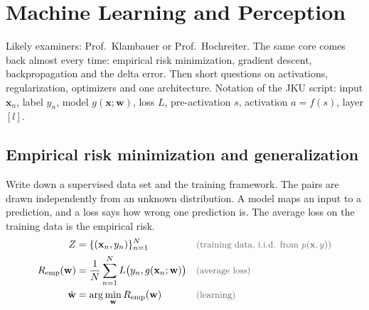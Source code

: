 \section{Machine Learning and Perception}

Likely examiners: Prof.\ Klambauer or Prof.\ Hochreiter. The same core comes back almost every
time: empirical risk minimization, gradient descent, backpropagation and the delta error. Then
short questions on activations, regularization, optimizers and one architecture. Notation of the
JKU script: input $\mathbf{x}_n$, label $y_n$, model $g(\mathbf{x};\mathbf{w})$, loss $L$,
pre-activation $s$, activation $a = f(s)$, layer $[l]$.

\subsection{Empirical risk minimization and generalization}

\begin{qabox}{Write down a supervised data set and the training framework.}
\explain The pairs are drawn independently from an unknown distribution. A model maps an input to a
prediction, and a loss says how wrong one prediction is. The average loss on the training data is
the empirical risk.
\derive
\begin{align*}
Z &= \{(\mathbf{x}_n,y_n)\}_{n=1}^{N} \why{training data, i.i.d. from $p(\mathbf{x},y)$} \\
\Remp(\mathbf{w}) &= \frac1N\sum_{n=1}^{N} L\bigl(y_n, g(\mathbf{x}_n;\mathbf{w})\bigr) \why{average loss} \\
\hat{\mathbf{w}} &= \arg\min_{\mathbf{w}} \Remp(\mathbf{w}) \why{learning}
\end{align*}
\end{qabox}

